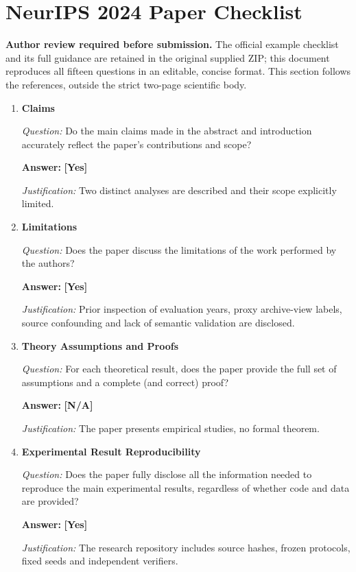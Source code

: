 \section*{NeurIPS 2024 Paper Checklist}
\noindent\textbf{Author review required before submission.} The official example checklist and its full guidance are retained in the original supplied ZIP; this document reproduces all fifteen questions in an editable, concise format. This section follows the references, outside the strict two-page scientific body.
\begin{enumerate}
\item \textbf{Claims}\par\noindent\textit{Question:} Do the main claims made in the abstract and introduction accurately reflect the paper's contributions and scope?\par\noindent\textbf{Answer:} \textbf{[Yes]}\par\noindent\textit{Justification:} Two distinct analyses are described and their scope explicitly limited.\par

\item \textbf{Limitations}\par\noindent\textit{Question:} Does the paper discuss the limitations of the work performed by the authors?\par\noindent\textbf{Answer:} \textbf{[Yes]}\par\noindent\textit{Justification:} Prior inspection of evaluation years, proxy archive-view labels, source confounding and lack of semantic validation are disclosed.\par

\item \textbf{Theory Assumptions and Proofs}\par\noindent\textit{Question:} For each theoretical result, does the paper provide the full set of assumptions and a complete (and correct) proof?\par\noindent\textbf{Answer:} \textbf{[N/A]}\par\noindent\textit{Justification:} The paper presents empirical studies, no formal theorem.\par

\item \textbf{Experimental Result Reproducibility}\par\noindent\textit{Question:} Does the paper fully disclose all the information needed to reproduce the main experimental results, regardless of whether code and data are provided?\par\noindent\textbf{Answer:} \textbf{[Yes]}\par\noindent\textit{Justification:} The research repository includes source hashes, frozen protocols, fixed seeds and independent verifiers.\par


\end{enumerate}
